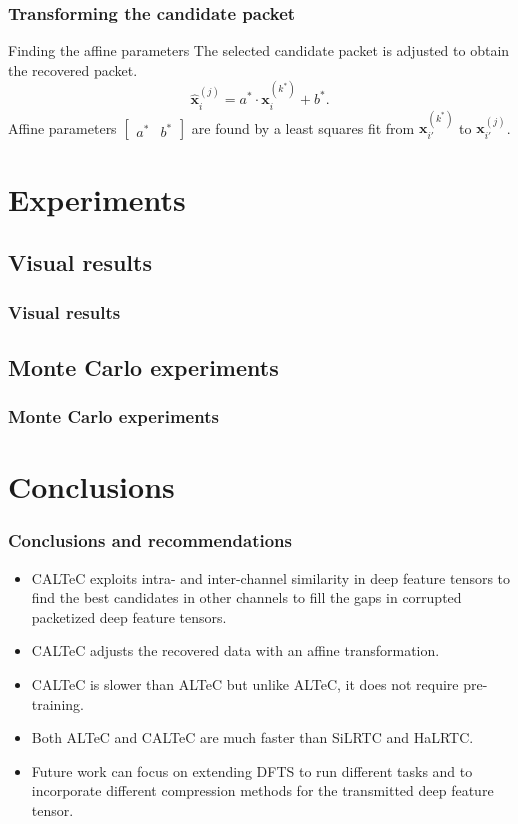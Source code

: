\documentclass[aspectratio=169]{beamer}
\begin{document}
\begin{frame}
	\frametitle{Transforming the candidate packet}
	\begin{block}{Finding the affine parameters}
		The selected candidate packet is adjusted to obtain the recovered packet.
		\[
		\widehat{\mathbf{x}}_i^{(j)} = a^*\cdot \mathbf{x}_i^{(k^*)} + b^*.
		\label{eq:recovered_packet}
		\]
		Affine parameters $\begin{bmatrix}a^*&b^* \end{bmatrix}$ are found by a least squares fit from $\mathbf{x}_{i'}^{(k^*)}$ to $\mathbf{x}_{i'}^{(j)}$.
	\end{block}
\end{frame}


\section{Experiments}
\subsection{Visual results}

\begin{frame}
    \frametitle{Visual results}
\end{frame}


\subsection{Monte Carlo experiments}

\begin{frame}
\frametitle{Monte Carlo experiments}
\end{frame}

\section{Conclusions}
\begin{frame}
	\frametitle{Conclusions and recommendations}
	\begin{itemize}
		\item CALTeC exploits intra- and inter-channel similarity in deep feature tensors to find the best candidates in other channels to fill the gaps in corrupted packetized deep feature tensors.
		\item CALTeC adjusts the recovered data with an affine transformation.
		\item CALTeC is slower than ALTeC but unlike ALTeC, it does not require pre-training.
		\item Both ALTeC and CALTeC are much faster than SiLRTC and HaLRTC.
		\item Future work can focus on extending DFTS to run different tasks and to incorporate different compression methods for the transmitted deep feature tensor.
	\end{itemize}
\end{frame}
\end{document}
